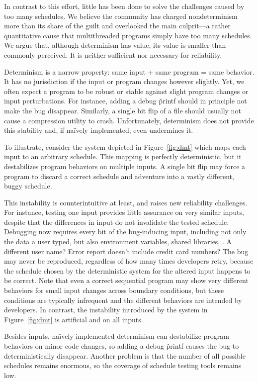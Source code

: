 In contrast to this effort, little has been done to solve the
challenges caused by too many schedules.  We believe
the community has charged nondeterminism more than its share of the guilt
and overlooked the main culprit---a rather quantitative cause that
multithreaded programs simply have too many schedules.
We argue that, although determinism has value, its value
is smaller than commonly perceived.  It is neither sufficient nor
necessary for reliability.

 Determinism is a
narrow property: same input + same program = same behavior. It has no
jurisdiction if the input or program changes however slightly.  Yet, we
often expect a program to be robust or stable against slight program
changes or input perturbations.  For instance, adding a debug \v{printf}
should in principle not make the bug disappear.  Similarly, a single bit flip of
a file should usually not cause a compression utility to crash. Unfortunately,
determinism does not provide this stability and, if na\"{i}vely implemented,
even undermines it.

To illustrate, consider the system depicted in
Figure~\ref{fig:dmt} which maps each input to an arbitrary schedule. This
mapping is perfectly deterministic, but it destabilizes program
behaviors on multiple inputs.  A single bit flip may force a program to
discard a correct schedule and adventure into a vastly different, buggy
schedule.

This instability is counterintuitive at least,
and raises new reliability challenges.  For instance, testing one input
provides little assurance on very similar inputs, despite that the differences
in input do not invalidate the tested schedule.  Debugging now requires
every bit of the bug-inducing input, including not only the data a user
typed, but also environment variables, shared libraries, \etc.  A
different user name?  Error report doesn't include credit card numbers?
The bug may never be reproduced, regardless of how many times developers
retry, because the schedule chosen by the deterministic system for the
altered input happens to be correct.  Note that even a correct
sequential program may show very different behaviors for small input
changes across boundary conditions, but these conditions are typically
infrequent and the different behaviors are intended by developers.  In
contrast, the instability introduced by the system in Figure~\ref{fig:dmt}
is artificial and on all inputs.

Besides inputs, na\"{i}vely implemented determinism can destabilize
program behaviors on minor code changes, so adding a debug \v{printf}
causes the bug to deterministically disappear.  Another problem is that
the number of all possible schedules remains enormous, so the coverage of
schedule testing tools remains low.

